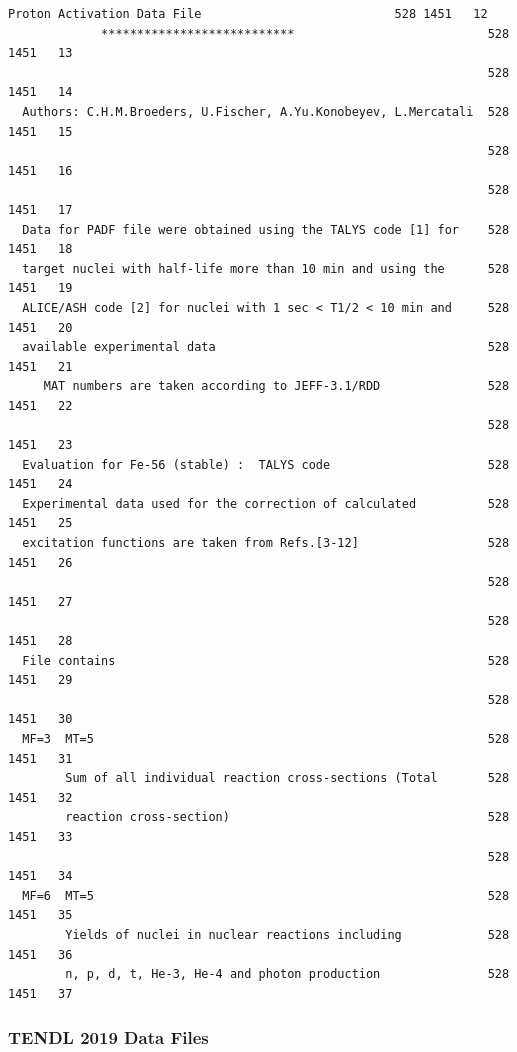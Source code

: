 \begin{lstlisting}[style=sFortran,caption={A sample of the Iron-56 PADF data file}]
             Proton Activation Data File                           528 1451   12
             ***************************                           528 1451   13
                                                                   528 1451   14
  Authors: C.H.M.Broeders, U.Fischer, A.Yu.Konobeyev, L.Mercatali  528 1451   15
                                                                   528 1451   16
                                                                   528 1451   17
  Data for PADF file were obtained using the TALYS code [1] for    528 1451   18
  target nuclei with half-life more than 10 min and using the      528 1451   19
  ALICE/ASH code [2] for nuclei with 1 sec < T1/2 < 10 min and     528 1451   20
  available experimental data                                      528 1451   21
     MAT numbers are taken according to JEFF-3.1/RDD               528 1451   22
                                                                   528 1451   23
  Evaluation for Fe-56 (stable) :  TALYS code                      528 1451   24
  Experimental data used for the correction of calculated          528 1451   25
  excitation functions are taken from Refs.[3-12]                  528 1451   26
                                                                   528 1451   27
                                                                   528 1451   28
  File contains                                                    528 1451   29
                                                                   528 1451   30
  MF=3  MT=5                                                       528 1451   31
        Sum of all individual reaction cross-sections (Total       528 1451   32
        reaction cross-section)                                    528 1451   33
                                                                   528 1451   34
  MF=6  MT=5                                                       528 1451   35
        Yields of nuclei in nuclear reactions including            528 1451   36
        n, p, d, t, He-3, He-4 and photon production               528 1451   37
\end{lstlisting}



\subsubsection{TENDL 2019 Data Files}

